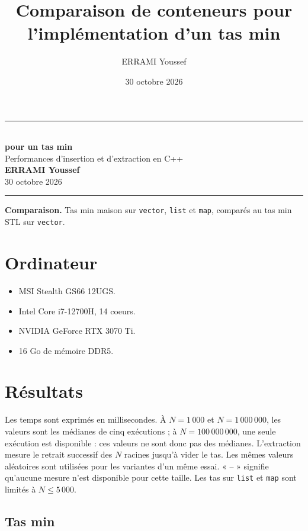\documentclass[12pt,a4paper]{article}
\title{Comparaison de conteneurs pour l'implémentation d'un tas min}
\author{ERRAMI Youssef}
\date{30 octobre 2026}
\begin{document}
\begin{center}
  {\color{bleuclair}\rule{\textwidth}{1.2pt}}\\[0.8em]
  {\Huge\bfseries\color{bleufonce}
    pour un tas min}\\[0.6em]
  {\Large\color{bleuclair}Performances d'insertion et d'extraction en C++}\\[1.2em]
  {\large\bfseries ERRAMI Youssef}\\[0.3em]
  {\color{bleufonce}30 octobre 2026}\\[0.8em]
  {\color{bleuclair}\rule{\textwidth}{1.2pt}}
\end{center}
\vspace{0.8em}

\noindent
\colorbox{grisclair}{%
  \parbox{\dimexpr\textwidth-2\fboxsep\relax}{%
    \textcolor{bleufonce}{\textbf{Comparaison.}}
    Tas min maison sur \texttt{vector}, \texttt{list} et \texttt{map},
    comparés au tas min STL sur \texttt{vector}.%
  }%
}

\section{Ordinateur}
\begin{itemize}
  \item MSI Stealth GS66 12UGS.
  \item Intel Core i7-12700H, 14 coeurs.
  \item NVIDIA GeForce RTX 3070 Ti.
  \item 16 Go de mémoire DDR5.
\end{itemize}

\section{Résultats}

Les temps sont exprimés en millisecondes. À $N=1\,000$ et $N=1\,000\,000$,
les valeurs sont les médianes de cinq exécutions ; à $N=100\,000\,000$, une
seule exécution est disponible : ces valeurs ne sont donc pas des médianes.
L'extraction mesure le retrait successif des $N$ racines jusqu'à vider le
tas. Les mêmes valeurs aléatoires sont utilisées pour les variantes d'un
même essai. « -- » signifie qu'aucune mesure n'est disponible pour cette
taille. Les tas sur \texttt{list} et \texttt{map} sont limités à $N\leq 5\,000$.

\subsection{Tas min}
\end{document}
